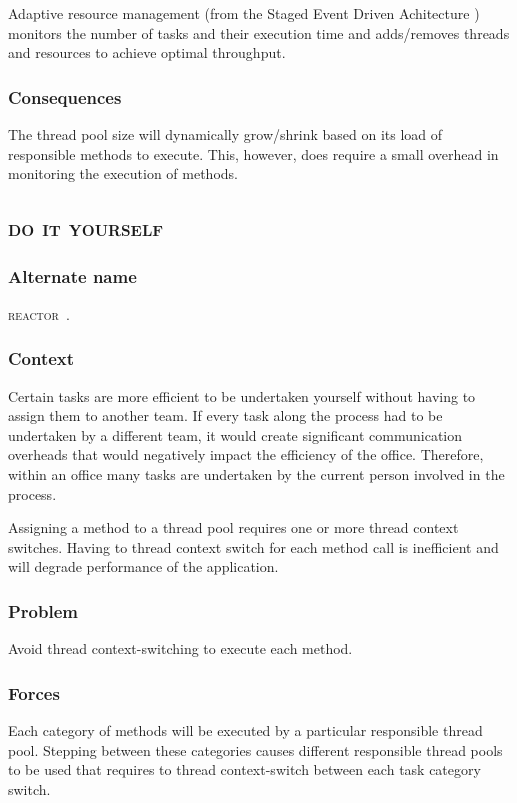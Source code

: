 \documentclass[prodmode]{style/acmlarge}
\begin{document}
Adaptive resource management (from the Staged Event Driven Achitecture
\cite{seda}) monitors the number of tasks and their execution time and
adds/removes threads and resources to achieve optimal throughput.

\subsubsection*{Consequences} The thread pool size will dynamically grow/shrink
based on its load of responsible methods to execute.  This, however, does
require a small overhead in monitoring the execution of methods.



\subsection{\textsc{\textbf{do it yourself}}}

\subsubsection*{Alternate name} \textsc{reactor}~\cite{reactor}.

\subsubsection*{Context} Certain tasks are more efficient to be undertaken
yourself without having to assign them to another team.  If every task along the
process had to be undertaken by a different team, it would create significant
communication overheads that would negatively impact the efficiency of the
office.  Therefore, within an office many tasks are undertaken by the current
person involved in the process.

Assigning a method to a thread pool requires one or more thread context
switches.  Having to thread context switch for each method call is inefficient
and will degrade performance of the application.

\subsubsection*{Problem} Avoid thread context-switching to execute each method.

\subsubsection*{Forces} Each category of methods will be executed by a particular
responsible thread pool.  Stepping between these categories causes different
responsible thread pools to be used that requires to thread context-switch between
each task category switch.
\end{document}
